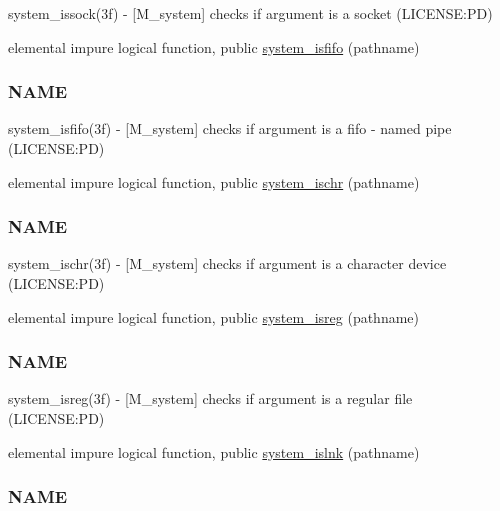 \begin{DoxyCompactItemize}
\begin{DoxyCompactList}
system\+\_\+issock(3f) -\/ \mbox{[}M\+\_\+system\mbox{]} checks if argument is a socket (L\+I\+C\+E\+N\+SE\+:PD) \end{DoxyCompactList}\item 
elemental impure logical function, public \mbox{\hyperlink{namespacem__system_aa2bdb5f75405d87934c10756b539d082}{system\+\_\+isfifo}} (pathname)
\begin{DoxyCompactList}\small\item\em \subsubsection*{N\+A\+ME}

system\+\_\+isfifo(3f) -\/ \mbox{[}M\+\_\+system\mbox{]} checks if argument is a fifo -\/ named pipe (L\+I\+C\+E\+N\+SE\+:PD) \end{DoxyCompactList}\item 
elemental impure logical function, public \mbox{\hyperlink{namespacem__system_a49f1d027d438aab86024660b0802768f}{system\+\_\+ischr}} (pathname)
\begin{DoxyCompactList}\small\item\em \subsubsection*{N\+A\+ME}

system\+\_\+ischr(3f) -\/ \mbox{[}M\+\_\+system\mbox{]} checks if argument is a character device (L\+I\+C\+E\+N\+SE\+:PD) \end{DoxyCompactList}\item 
elemental impure logical function, public \mbox{\hyperlink{namespacem__system_a8ea0d0430227af61b8083b4e7d6e597d}{system\+\_\+isreg}} (pathname)
\begin{DoxyCompactList}\small\item\em \subsubsection*{N\+A\+ME}

system\+\_\+isreg(3f) -\/ \mbox{[}M\+\_\+system\mbox{]} checks if argument is a regular file (L\+I\+C\+E\+N\+SE\+:PD) \end{DoxyCompactList}\item 
elemental impure logical function, public \mbox{\hyperlink{namespacem__system_a268d0cd27be36527894fe2cae0f1b9f6}{system\+\_\+islnk}} (pathname)
\begin{DoxyCompactList}\small\item\em \subsubsection*{N\+A\+ME}


\end{DoxyCompactList}
\end{DoxyCompactItemize}
